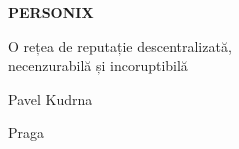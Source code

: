 \thispagestyle{empty}
\begin{center}
  {\sffamily\bfseries\fontsize{34}{40}\selectfont PERSONIX\par}
  \vspace{2.2em}
  {\rmfamily\large O rețea de reputație descentralizată,\\[0.25em]
   necenzurabilă și incoruptibilă\par}
\end{center}
\begin{center}
  {\rmfamily\Large Pavel Kudrna\par}
  \vspace{0.45em}
  {\rmfamily\small Praga\quad\textbullet{}\par}
\end{center}
\clearpage
